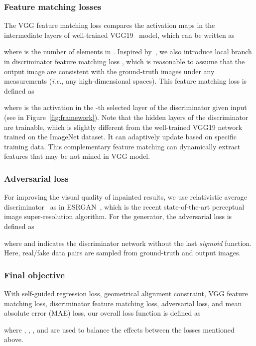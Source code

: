 \documentclass[journal]{IEEEtran}
\newcommand{\ie}{\emph{i.e.}}
\begin{document}
\subsubsection{Feature matching losses} 
The VGG feature matching loss  compares the activation maps in the intermediate layers of well-trained VGG19~\cite{VGG19} model, which can be written as

where  is the number of elements in . Inspired by~\cite{perceptual-adversarial}, we also introduce local branch in discriminator feature matching loss , which is reasonable to assume that the output image are consistent with the ground-truth images under any measurements (\ie, any high-dimensional spaces). This feature matching loss is defined as

where  is the activation in the -th selected layer of the discriminator given input  (see in Figure~\ref{fig:framework}). Note that the hidden layers of the discriminator are trainable, which is slightly different from the well-trained VGG19 network trained on the ImageNet dataset. It can adaptively update based on specific training data. This complementary feature matching can dynamically extract features that may be not mined in VGG model. 

\subsubsection{Adversarial loss}
For improving the visual quality of inpainted results, we use relativistic average discriminator~\cite{RaGAN} as in ESRGAN~\cite{ESRGAN}, which is the recent state-of-the-art perceptual image super-resolution algorithm. For the generator, the adversarial loss is defined as

where  and  indicates the discriminator network without the last \emph{sigmoid} function. Here, real/fake data pairs  are sampled from ground-truth and output images.

\subsubsection{Final objective}
With self-guided regression loss, geometrical alignment constraint, VGG feature matching loss, discriminator feature matching loss, adversarial loss, and mean absolute error (MAE) loss, our overall loss function is defined as

where , , , and  are used to balance the effects between the losses mentioned above.
\end{document}
